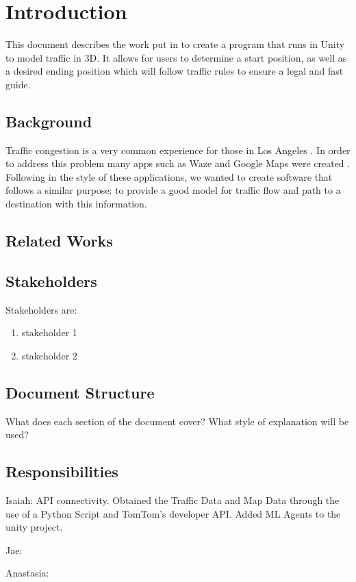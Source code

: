 \section{Introduction}

This document describes the work put in to create a program that runs in Unity to model traffic in 3D.
It allows for users to determine a start position, as well as a desired ending position which will follow traffic rules to ensure a legal and fast guide.

\subsection{Background}

Traffic congestion is a very common experience for those in Los Angeles \cite{CNN}.
In order to address this problem many apps such as Waze and Google Maps were created \cite{TraffApps}.
Following in the style of these applications, we wanted to create software that follows a similar purpose: to provide a good model for traffic flow and path to a destination with this information.

\subsection{Related Works}



\subsection{Stakeholders}

Stakeholders are: 
\begin{enumerate}
    \item stakeholder 1
    \item stakeholder 2
\end{enumerate}

\subsection{Document Structure}

What does each section of the document cover?
What style of explanation will be used?

\subsection{Responsibilities}

Isaiah: API connectivity.
Obtained the Traffic Data and Map Data through the use of a Python Script and TomTom's developer API.
Added ML Agents to the unity project.

Jae: 

Anastasia: 